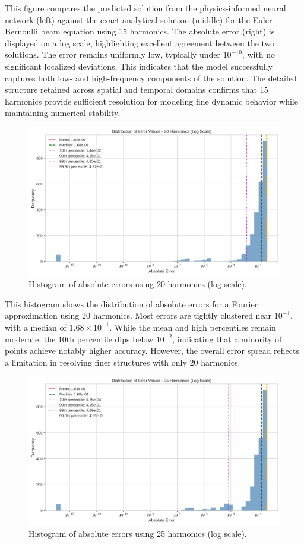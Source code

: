 \documentclass[preprint,12pt]{elsarticle}
\begin{document}
This figure compares the predicted solution from the physics-informed neural network (left) against the exact analytical solution (middle) for the Euler-Bernoulli beam equation using 15 harmonics. The absolute error (right) is displayed on a log scale, highlighting excellent agreement between the two solutions. The error remains uniformly low, typically under \(10^{-10}\), with no significant localized deviations. This indicates that the model successfully captures both low- and high-frequency components of the solution. The detailed structure retained across spatial and temporal domains confirms that 15 harmonics provide sufficient resolution for modeling fine dynamic behavior while maintaining numerical stability.

\begin{figure}[t]
    \centering
    \includegraphics[width=0.9\linewidth]{figures/error_distribution_20h.png}
    \caption{Histogram of absolute errors using 20 harmonics (log scale).}
    \label{fig:error_20h}
\end{figure}

This histogram shows the distribution of absolute errors for a Fourier approximation using 20 harmonics. Most errors are tightly clustered near \(10^{-1}\), with a median of \(1.68 \times 10^{-1}\). While the mean and high percentiles remain moderate, the 10th percentile dips below \(10^{-2}\), indicating that a minority of points achieve notably higher accuracy. However, the overall error spread reflects a limitation in resolving finer structures with only 20 harmonics.

\begin{figure}[t]
    \centering
    \includegraphics[width=0.9\linewidth]{figures/error_distribution_25h.png}
    \caption{Histogram of absolute errors using 25 harmonics (log scale).}
    \label{fig:error_25h}
\end{figure}
\end{document}
